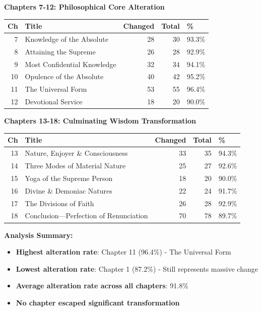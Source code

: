 \documentclass[11pt,twoside]{book}
\begin{document}
\textbf{\textbf{Chapters 7-12: Philosophical Core Alteration}}

\small
\begin{center}
\begin{tabular}{rlrrl}
Ch & Title & Changed & Total & \%\\
\hline
7 & Knowledge of the Absolute & 28 & 30 & 93.3\%\\
8 & Attaining the Supreme & 26 & 28 & 92.9\%\\
9 & Most Confidential Knowledge & 32 & 34 & 94.1\%\\
10 & Opulence of the Absolute & 40 & 42 & 95.2\%\\
11 & The Universal Form & 53 & 55 & 96.4\%\\
12 & Devotional Service & 18 & 20 & 90.0\%\\
\end{tabular}
\end{center}

\textbf{\textbf{Chapters 13-18: Culminating Wisdom Transformation}}

\small
\begin{center}
\begin{tabular}{rlrrl}
Ch & Title & Changed & Total & \%\\
\hline
13 & Nature, Enjoyer \& Consciousness & 33 & 35 & 94.3\%\\
14 & Three Modes of Material Nature & 25 & 27 & 92.6\%\\
15 & Yoga of the Supreme Person & 18 & 20 & 90.0\%\\
16 & Divine \& Demoniac Natures & 22 & 24 & 91.7\%\\
17 & The Divisions of Faith & 26 & 28 & 92.9\%\\
18 & Conclusion—Perfection of Renunciation & 70 & 78 & 89.7\%\\
\end{tabular}
\end{center}

\normalsize

\textbf{\textbf{Analysis Summary:}}
\begin{itemize}
\item \textbf{\textbf{Highest alteration rate}}: Chapter 11 (96.4\%) - The Universal Form
\item \textbf{\textbf{Lowest alteration rate}}: Chapter 1 (87.2\%) - Still represents massive change
\item \textbf{\textbf{Average alteration rate across all chapters}}: 91.8\%
\item \textbf{\textbf{No chapter escaped significant transformation}}
\end{itemize}
\end{document}

